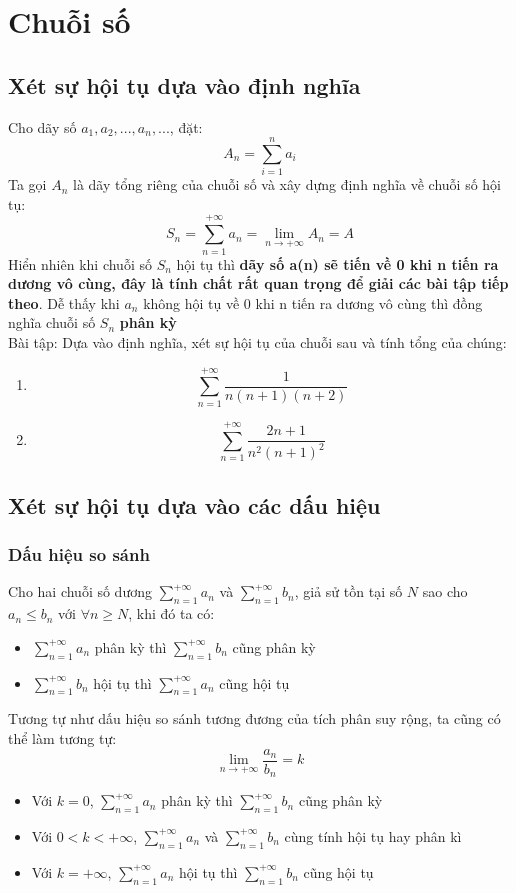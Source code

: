 \documentclass{article}
\begin{document}
\section{Chuỗi số}
\subsection{Xét sự hội tụ dựa vào định nghĩa}
Cho dãy số $a_{1},a_{2},...,a_{n},...$, đặt: $$A_{n}=\sum_{i=1}^{n}a_{i}$$
Ta gọi $A_{n}$ là dãy tổng riêng của chuỗi số và xây dựng định nghĩa về chuỗi số hội tụ: $$S_{n}=\sum_{n=1}^{+\infty}a_{n}=\lim_{n\to+\infty}A_{n}=A$$
Hiển nhiên khi chuỗi số $S_{n}$ hội tụ thì \textbf{dãy số a(n) sẽ tiến về 0 khi n tiến ra dương vô cùng, đây là tính chất rất quan trọng để giải các bài tập tiếp theo}. Dễ thấy khi $a_{n}$ không hội tụ về 0 khi n tiến ra dương vô cùng thì đồng nghĩa chuỗi số $S_{n}$ \textbf{phân kỳ}
\\Bài tập: Dựa vào định nghĩa, xét sự hội tụ của chuỗi sau và tính tổng của chúng:
\begin{enumerate}
    \item $$\sum_{n=1}^{+\infty}\frac{1}{n(n+1)(n+2)}$$
    \item $$\sum_{n=1}^{+\infty}\frac{2n+1}{n^2(n+1)^2}$$
\end{enumerate}
\subsection{Xét sự hội tụ dựa vào các dấu hiệu}
\subsubsection{Dấu hiệu so sánh}
Cho hai chuỗi số dương $\sum_{n=1}^{+\infty}a_{n}$ và $\sum_{n=1}^{+\infty}b_{n}$, giả sử tồn tại số $N$ sao cho $a_{n}\leq b_{n}$ với $\forall n\geq N$, khi đó ta có:
\begin{itemize}
    \item $\sum_{n=1}^{+\infty}a_{n}$ phân kỳ thì $\sum_{n=1}^{+\infty}b_{n}$ cũng phân kỳ
    \item $\sum_{n=1}^{+\infty}b_{n}$ hội tụ thì $\sum_{n=1}^{+\infty}a_{n}$ cũng hội tụ
\end{itemize}
Tương tự như dấu hiệu so sánh tương đương của tích phân suy rộng, ta cũng có thể làm tương tự: $$\lim_{n\to+\infty}\frac{a_{n}}{b_{n}}=k$$
\begin{itemize}
    \item Với $k=0$, $\sum_{n=1}^{+\infty}a_{n}$ phân kỳ thì $\sum_{n=1}^{+\infty}b_{n}$ cũng phân kỳ
    \item Với $0<k<+\infty$, $\sum_{n=1}^{+\infty}a_{n}$ và $\sum_{n=1}^{+\infty}b_{n}$ cùng tính hội tụ hay phân kì
    \item Với $k=+\infty$, $\sum_{n=1}^{+\infty}a_{n}$ hội tụ thì $\sum_{n=1}^{+\infty}b_{n}$ cũng hội tụ
\end{itemize}
\end{document}
